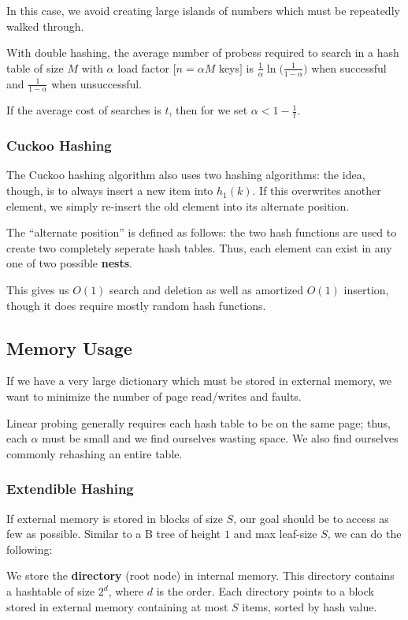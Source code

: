 \documentclass[12pt]{article}
\begin{document}
In this case, we avoid creating large islands of numbers which must be repeatedly walked through.

\begin{theorem}
With double hashing, the average number of probess required to search in a hash table of size $M$ with $\alpha$ load factor $[n = \alpha M$ keys$]$ is $\frac{1}{\alpha} \ln \bigl(\frac{1}{1-\alpha}\bigl)$ when successful and $\frac{1}{1-\alpha}$ when unsuccessful.

If the average cost of searches is $t$, then for we set $\alpha < 1 - \frac{1}{t}$.
\end{theorem}

\subsubsection{Cuckoo Hashing}
The Cuckoo hashing algorithm also uses two hashing algorithms: the idea, though, is to always insert a new item into $h_1(k)$. If this overwrites another element, we simply re-insert the old element into its alternate position.

The ``alternate position'' is defined as follows: the two hash functions are used to create two completely seperate hash tables. Thus, each element can exist in any one of two possible {\bf nests}.

This gives us $O(1)$ search and deletion as well as amortized $O(1)$ insertion, though it does require mostly random hash functions.

\subsection{Memory Usage}
If we have a very large dictionary which must be stored in external memory, we want to minimize the number of page read/writes and faults.

Linear probing generally requires each hash table to be on the same page; thus, each $\alpha$ must be small and we find ourselves wasting space. We also find ourselves commonly rehashing an entire table.

\subsubsection{Extendible Hashing}
If external memory is stored in blocks of size $S$, our goal should be to access as few as possible. Similar to a B tree of height $1$ and max leaf-size $S$, we can do the following:

We store the {\bf directory} (root node) in internal memory. This directory contains a hashtable of size $2^d$, where $d$ is the order. Each directory points to a block stored in external memory containing at most $S$ items, sorted by hash value.
\end{document}
